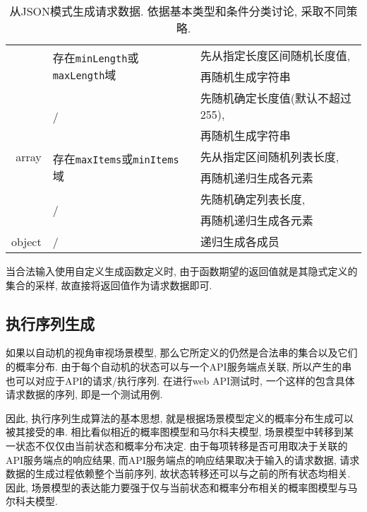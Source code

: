 \begin{table}[!htb]
\begin{tabular}{rll}
                    \cline{2-3}
                    & \multirow{2}{*}{存在\texttt{minLength}或\texttt{maxLength}域} & 先从指定长度区间随机长度值, \\
                    & & 再随机生成字符串 \\
                    \cline{2-3}
                    & \multirow{2}{*}{/} & 先随机确定长度值(默认不超过255),\\
                    & & 再随机生成字符串 \\
                    \hline
                    array & \multirow{2}{*}{存在\texttt{maxItems}或\texttt{minItems}域} & 先从指定区间随机列表长度,\\
                    & & 再随机递归生成各元素 \\
                    \cline{2-3}
                    & \multirow{2}{*}{/} & 先随机确定列表长度,\\
                    & & 再随机递归生成各元素 \\
                    \hline
                    object & / & 递归生成各成员 \\
                    \bottomrule
                \end{tabular}
                \caption{从JSON模式生成请求数据. 依据基本类型和条件分类讨论, 采取不同策略.}
                \label{tab:schemagen}
            \end{table}
            
            当合法输入使用自定义生成函数定义时, 由于函数期望的返回值就是其隐式定义的集合的采样, 故直接将返回值作为请求数据即可.
        
        \subsection{执行序列生成}
            如果以自动机的视角审视场景模型, 那么它所定义的仍然是合法串的集合以及它们的概率分布. 由于每个自动机的状态可以与一个API服务端点关联, 所以产生的串也可以对应于API的请求/执行序列. 在进行web API测试时, 一个这样的包含具体请求数据的序列, 即是一个测试用例.
            
            因此, 执行序列生成算法的基本思想, 就是根据场景模型定义的概率分布生成可以被其接受的串. 相比看似相近的概率图模型和马尔科夫模型, 场景模型中转移到某一状态不仅仅由当前状态和概率分布决定. 由于每项转移是否可用取决于关联的API服务端点的响应结果, 而API服务端点的响应结果取决于输入的请求数据, 请求数据的生成过程依赖整个当前序列, 故状态转移还可以与之前的所有状态均相关. 因此, 场景模型的表达能力要强于仅与当前状态和概率分布相关的概率图模型与马尔科夫模型.
            
